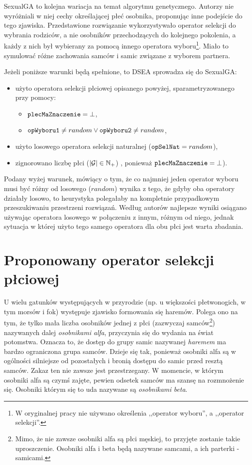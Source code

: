 \documentclass[./FM_mgr.tex]{subfiles}
\begin{document}
SexualGA \cite{SexualGA} to kolejna wariacja na temat algorytmu genetycznego. Autorzy nie wyróżniali w niej cechy określającej płeć osobnika, proponując inne podejście do tego zjawiska. Przedstawione rozwiązanie wykorzystywało operator selekcji do wybrania rodziców, a nie osobników przechodzących do kolejnego pokolenia, a każdy z nich był wybierany za pomocą innego operatora wyboru\footnote{
	W oryginalnej pracy nie używano określenia ,,operator wyboru'', a ,,operator selekcji''.
}. Miało to symulować różne zachowania samców i samic związane z wyborem partnera.

Jeżeli poniższe warunki będą spełnione, to DSEA sprowadza się do SexualGA:
\begin{itemize}
	\item użyto operatora selekcji płciowej opisanego powyżej, sparametryzowanego przy pomocy:
	\begin{itemize}
		\item $\mathtt{plecMaZnaczenie} = \bot$,
		\item $\mathtt{opWyboru1} \neq random \vee \mathtt{opWyboru2} \neq random$,
	\end{itemize}
	\item użyto losowego operatora selekcji naturalnej ($\mathtt{opSelNat} = random$),
	\item zignorowano liczbę płci ($|\mathcal{G}| \in \mathbb{N}_{+}$) , ponieważ $\mathtt{plecMaZnaczenie} = \bot$).
\end{itemize}

Podany wyżej warunek, mówiący o tym, że co najmniej jeden operator wyboru musi być różny od losowego ($random$) wynika z tego, że gdyby oba operatory działały losowo, to heurystyka polegałaby na kompletnie przypadkowym przeszukiwaniu przestrzeni rozwiązań.
Według autorów najlepsze wyniki osiągano używając operatora losowego w połączeniu z innym, różnym od niego, jednak sytuacja w której użyto tego samego operatora dla obu płci jest warta zbadania.

\section{Proponowany operator selekcji płciowej}

U wielu gatunków występujących w przyrodzie (np. u większości płetwonogich\cite{pletwonogiMajaHaremy}, w tym morsów i fok) występuje zjawisko formowania się haremów.
Polega ono na tym, że tylko mała liczba osobników jednej z płci (zazwyczaj samców\footnote{
	Mimo, że nie zawsze osobniki alfa są płci męskiej, to przyjęte zostanie takie uproszczenie. 
	Osobniki alfa i beta będą nazywane samcami, a ich parterki - samicami.
}) nazywanych dalej \emph{osobnikami alfa}, przyczynia się do wydania na świat potomstwa.
Oznacza to, że dostęp do grupy samic nazywanej \emph{haremem} ma bardzo ograniczona grupa samców.
Dzieje się tak, ponieważ osobniki alfa są w ogólności silniejsze od pozostałych i bronią dostępu do samic przed resztą samców.
Zakaz ten nie zawsze jest przestrzegany.
W momencie, w którym osobniki alfa są czymś zajęte, pewien odsetek samców ma szansę na rozmnożenie się.
Osobniki którym się to uda nazywane są \emph{osobnikami beta}.
\end{document}
